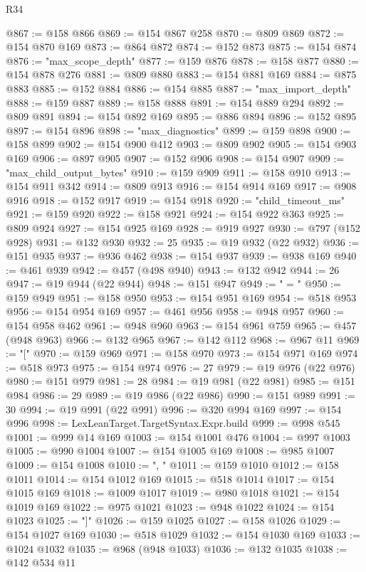 \begin{lexlean}{R34}
\begin{coremodule}
@867 := @158 @866
@869 := @154 @867 @258
@870 := @809 @869
@872 := @154 @870 @169
@873 := @864 @872
@874 := @152 @873
@875 := @154 @874
@876 := "max_scope_depth"
@877 := @159 @876
@878 := @158 @877
@880 := @154 @878 @276
@881 := @809 @880
@883 := @154 @881 @169
@884 := @875 @883
@885 := @152 @884
@886 := @154 @885
@887 := "max_import_depth"
@888 := @159 @887
@889 := @158 @888
@891 := @154 @889 @294
@892 := @809 @891
@894 := @154 @892 @169
@895 := @886 @894
@896 := @152 @895
@897 := @154 @896
@898 := "max_diagnostics"
@899 := @159 @898
@900 := @158 @899
@902 := @154 @900 @412
@903 := @809 @902
@905 := @154 @903 @169
@906 := @897 @905
@907 := @152 @906
@908 := @154 @907
@909 := "max_child_output_bytes"
@910 := @159 @909
@911 := @158 @910
@913 := @154 @911 @342
@914 := @809 @913
@916 := @154 @914 @169
@917 := @908 @916
@918 := @152 @917
@919 := @154 @918
@920 := "child_timeout_ms"
@921 := @159 @920
@922 := @158 @921
@924 := @154 @922 @363
@925 := @809 @924
@927 := @154 @925 @169
@928 := @919 @927
@930 := @797 (@152 @928)
@931 := @132 @930
@932 := 25
@935 := @19 @932 (@22 @932)
@936 := @151 @935
@937 := @936 @462
@938 := @154 @937
@939 := @938 @169
@940 := @461 @939
@942 := @457 (@498 @940)
@943 := @132 @942
@944 := 26
@947 := @19 @944 (@22 @944)
@948 := @151 @947
@949 := " = "
@950 := @159 @949
@951 := @158 @950
@953 := @154 @951 @169
@954 := @518 @953
@956 := @154 @954 @169
@957 := @461 @956
@958 := @948 @957
@960 := @154 @958 @462
@961 := @948 @960
@963 := @154 @961 @759
@965 := @457 (@948 @963)
@966 := @132 @965
@967 := @142 @112
@968 := @967 @11
@969 := "["
@970 := @159 @969
@971 := @158 @970
@973 := @154 @971 @169
@974 := @518 @973
@975 := @154 @974
@976 := 27
@979 := @19 @976 (@22 @976)
@980 := @151 @979
@981 := 28
@984 := @19 @981 (@22 @981)
@985 := @151 @984
@986 := 29
@989 := @19 @986 (@22 @986)
@990 := @151 @989
@991 := 30
@994 := @19 @991 (@22 @991)
@996 := @320 @994 @169
@997 := @154 @996
@998 := LexLeanTarget.TargetSyntax.Expr.build
@999 := @998 @545
@1001 := @999 @14 @169
@1003 := @154 @1001 @476
@1004 := @997 @1003
@1005 := @990 @1004
@1007 := @154 @1005 @169
@1008 := @985 @1007
@1009 := @154 @1008
@1010 := ", "
@1011 := @159 @1010
@1012 := @158 @1011
@1014 := @154 @1012 @169
@1015 := @518 @1014
@1017 := @154 @1015 @169
@1018 := @1009 @1017
@1019 := @980 @1018
@1021 := @154 @1019 @169
@1022 := @975 @1021
@1023 := @948 @1022
@1024 := @154 @1023
@1025 := "]"
@1026 := @159 @1025
@1027 := @158 @1026
@1029 := @154 @1027 @169
@1030 := @518 @1029
@1032 := @154 @1030 @169
@1033 := @1024 @1032
@1035 := @968 (@948 @1033)
@1036 := @132 @1035
@1038 := @142 @534 @11

\end{coremodule}
\end{lexlean}
